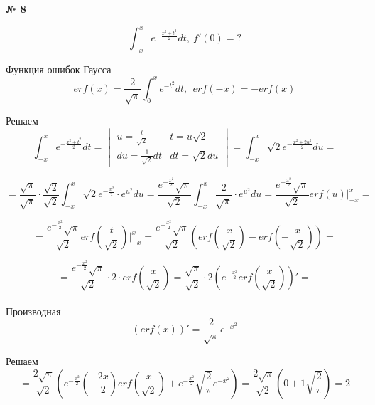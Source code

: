 \documentclass{article}
\begin{document}
\textbf{№ 8} 
\Large

$$ \int_{-x}^{x} e^{-\frac{x^2+t^2}{2}} dt, \ f'(0) = ? $$

Функция ошибок Гаусса
$$ erf(x) = \frac{2}{\sqrt{\pi}} \int_{0}^{x} e^{-t^2}dt, \ \ erf(-x) = -erf(x) $$

Решаем
$$ \int_{-x}^{x} e^{-\frac{x^2+t^2}{2}} dt
= \begin{vmatrix} u = \frac{t}{\sqrt{2}} & t = u\sqrt{2} \\
                 du = \frac{1}{\sqrt{2}}dt & dt = \sqrt{2}du \end{vmatrix} 
= \int_{-x}^{x} \sqrt{2} e^{-\frac{x^2+2u^2}{2}} du 
= $$

$$ = \frac{\sqrt{\pi}}{\sqrt{\pi}} \cdot \frac{\sqrt{2}}{\sqrt{2}} \int_{-x}^{x} \sqrt{2} e^{-\frac{x^2}{2}} \cdot e^{u^2} du 
= \frac{e^{-\frac{x^2}{2}} \sqrt{\pi}}{\sqrt{2}} \int_{-x}^{x} \frac{2}{\sqrt{\pi}} \cdot e^{u^2} du 
= \frac{e^{-\frac{x^2}{2}} \sqrt{\pi}}{\sqrt{2}} erf(u) \bigg\vert_{-x}^{x} 
= $$

$$ = \frac{e^{-\frac{x^2}{2}} \sqrt{\pi}}{\sqrt{2}} erf(\frac{t}{\sqrt{2}}) \bigg\vert_{-x}^{x} 
= \frac{e^{-\frac{x^2}{2}} \sqrt{\pi}}{\sqrt{2}} \left( erf(\frac{x}{\sqrt{2}}) - erf(-\frac{x}{\sqrt{2}}) \right)  
= $$

$$ = \frac{e^{-\frac{x^2}{2}} \sqrt{\pi}}{\sqrt{2}} \cdot 2 \cdot erf(\frac{x}{\sqrt{2}}) 
= \frac{ \sqrt{\pi}}{\sqrt{2}} \cdot 2 \left( e^{-\frac{x^2}{2}} erf(\frac{x}{\sqrt{2}}) \right)' 
= $$
\\
Производная
$$ (erf(x))' 
= \frac{2}{\sqrt{\pi}} e^{-x^2} $$

Решаем
$$ = \frac{2 \sqrt{\pi}}{\sqrt{2}} \left( e^{-\frac{x^2}{2}} (-\frac{2x}{2}) erf(\frac{x}{\sqrt{2}}) + e^{-\frac{x^2}{2}} \sqrt{\frac{2}{\pi}} e^{-x^2} \right) 
= \frac{2 \sqrt{\pi}}{\sqrt{2}} \left( 0 + 1 \sqrt{\frac{2}{\pi}} \right)
= 2 $$
\end{document}
